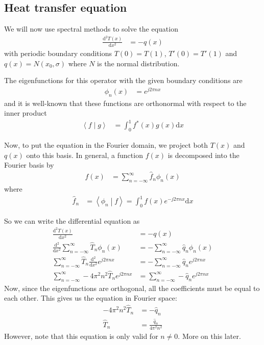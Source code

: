 \documentclass[twocolumn]{myarticle}
\renewcommand{\d}{\mathrm{d}}
\begin{document}
\subsection{Heat transfer equation}
\label{subsec:heat_transfer_equation}

We will now use spectral methods to solve the equation
\begin{align}
    \frac{\d^2 T(x)}{\d x^2} &= - q(x)
\end{align}
with periodic boundary conditions $ T(0) = T(1) $, $ T'(0) = T'(1) $ and $ q(x) = N(x_0, \sigma) $ where $ N $ is the normal distribution.

The eigenfunctions for this operator with the given boundary conditions are
\begin{align}
    \phi_n(x) &= e^{j 2 \pi n x}
\end{align}
and it is well-known that these functions are orthonormal with respect to the inner product
\begin{align}
    \left\langle f \middle| g \right\rangle &= \int_0^1 f^*(x) g(x) \d x
\end{align}

Now, to put the equation in the Fourier domain, we project both $ T(x) $ and $ q(x) $ onto this basis.
In general, a function $ f(x) $ is decomposed into the Fourier basis by
\begin{align}
    f(x) &= \sum_{n = -\infty}^{\infty} \hat{f}_n \phi_n(x)
\end{align}
where
\begin{align}
    \hat{f}_n &= \left\langle \phi_n \middle| f \right\rangle = \int_0^1 f(x) e^{-j 2 \pi n x} \d x
\end{align}

So we can write the differential equation as
\begin{align}
    \frac{\d^2 T(x)}{\d x^2} &= - q(x)
    \\
    \frac{\d^2}{\d x^2} \sum_{n = -\infty}^{\infty} \hat{T}_n \phi_n(x) &= -\sum_{n=-\infty}^{\infty} \hat{q}_n \phi_n(x)
    \\
    \sum_{n = -\infty}^{\infty} \hat{T}_n \frac{\d^2}{\d x^2} e^{j 2 \pi n x} &= -\sum_{n=-\infty}^{\infty} \hat{q}_n e^{j 2 \pi n x}
    \\
    \sum_{n = -\infty}^{\infty} - 4 \pi^2 n^2 \hat{T}_n e^{j 2 \pi n x} &= \sum_{n=-\infty}^{\infty} -\hat{q}_n e^{j 2 \pi n x}
\end{align}
Now, since the eigenfunctions are orthogonal, all the coefficients must be equal to each other.
This gives us the equation in Fourier space:
\begin{align}
    - 4 \pi^2 n^2 \hat{T}_n &= - \hat{q}_n \label{eq:fourier_de1}
    \\
    \hat{T}_n &= \frac{\hat{q}_n}{4 \pi^2 n^2}
\end{align}
However, note that this equation is only valid for $ n \neq 0 $.
More on this later.
\end{document}
